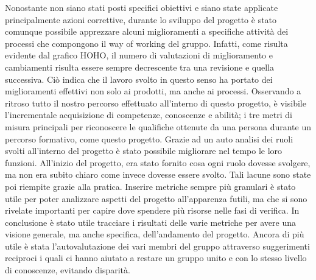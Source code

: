 	\newline\newline
	Nonostante non siano stati posti specifici obiettivi e siano state applicate principalmente azioni correttive, durante lo sviluppo del progetto è stato comunque possibile apprezzare alcuni miglioramenti a specifiche attività dei processi che compongono il way of working del gruppo. Infatti, come risulta evidente dal grafico HOHO, il numero di valutazioni di miglioramento e cambiamenti risulta essere sempre decrescente tra una revisione e quella successiva. Ciò indica che il lavoro svolto in questo senso ha portato dei miglioramenti effettivi non solo ai prodotti, ma anche ai processi.
	\newline\newline
	Osservando a ritroso tutto il nostro percorso effettuato all’interno di questo progetto, è visibile l’incrementale acquisizione di competenze, conoscenze e abilità; i tre metri di misura principali per riconoscere le qualifiche ottenute da una persona durante un percorso formativo, come questo progetto.
	\newline
	Grazie ad un auto analisi dei ruoli svolti all’interno del progetto è stato possibile migliorare nel tempo le loro funzioni. All’inizio del progetto, era stato fornito cosa ogni ruolo dovesse svolgere, ma non era subito chiaro come invece dovesse essere svolto. Tali lacune sono state poi riempite grazie alla pratica.
	\newline
	Inserire metriche sempre più granulari è stato utile per poter analizzare aspetti del progetto all’apparenza futili, ma che si sono rivelate importanti per capire dove spendere più risorse nelle fasi di verifica.
	\newline
	In conclusione è stato utile tracciare i risultati delle varie metriche per avere una visione generale, ma anche specifica, dell’andamento del progetto. Ancora di più utile è stata l’autovalutazione dei vari membri del gruppo attraverso suggerimenti reciproci i quali ci hanno aiutato a restare un gruppo unito e con lo stesso livello di conoscenze, evitando disparità.
